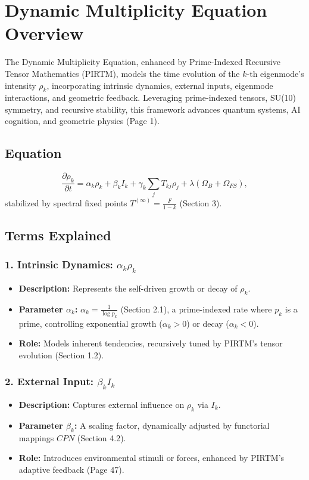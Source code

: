 \documentclass{article}
\theoremstyle{plain}
\begin{document}
\section*{Dynamic Multiplicity Equation Overview}

The Dynamic Multiplicity Equation, enhanced by Prime-Indexed Recursive Tensor Mathematics (PIRTM), models the time evolution of the \( k \)-th eigenmode’s intensity \( \rho_k \), incorporating intrinsic dynamics, external inputs, eigenmode interactions, and geometric feedback. Leveraging prime-indexed tensors, SU(10) symmetry, and recursive stability, this framework advances quantum systems, AI cognition, and geometric physics (Page 1).

\subsection*{Equation}
\begin{equation}
\frac{\partial \rho_k}{\partial t} = \alpha_k \rho_k + \beta_k I_k + \gamma_k \sum_j T_{kj} \rho_j + \lambda (\Omega_B + \Omega_{FS}),
\end{equation}
stabilized by spectral fixed points \( T^{(\infty)} = \frac{F}{1 - k} \) (Section 3).

\subsection*{Terms Explained}

\subsubsection*{1. Intrinsic Dynamics: \(\alpha_k \rho_k\)}
\begin{itemize}
    \item \textbf{Description:} Represents the self-driven growth or decay of \( \rho_k \).
    \item \textbf{Parameter \(\alpha_k\):} \( \alpha_k = \frac{1}{\log p_k} \) (Section 2.1), a prime-indexed rate where \( p_k \) is a prime, controlling exponential growth (\( \alpha_k > 0 \)) or decay (\( \alpha_k < 0 \)).
    \item \textbf{Role:} Models inherent tendencies, recursively tuned by PIRTM’s tensor evolution (Section 1.2).
\end{itemize}

\subsubsection*{2. External Input: \(\beta_k I_k\)}
\begin{itemize}
    \item \textbf{Description:} Captures external influence on \( \rho_k \) via \( I_k \).
    \item \textbf{Parameter \(\beta_k\):} A scaling factor, dynamically adjusted by functorial mappings \( CPN \) (Section 4.2).
    \item \textbf{Role:} Introduces environmental stimuli or forces, enhanced by PIRTM’s adaptive feedback (Page 47).
\end{itemize}
\end{document}
